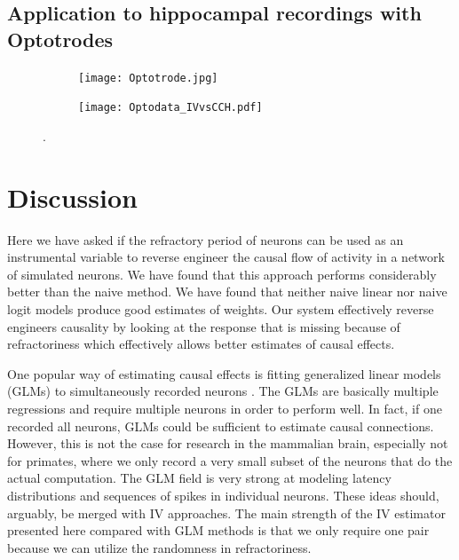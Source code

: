 \documentclass[11pt]{article}
\begin{document}
\subsection{Application to hippocampal recordings with Optotrodes}
\begin{figure}
\makeatletter
\renewcommand\p@subfigure{}
\makeatother
\begin{subfigure}{0.4\textwidth}
\texttt{[image: Optotrode.jpg]}
\caption{} \label{}
\end{subfigure}\hfill
\begin{subfigure}{0.6\textwidth}
\texttt{[image: Optodata\_IVvsCCH.pdf]}
\caption{} \label{}
\end{subfigure}

\caption{}.
\label{fig:optotrodedata}
 \end{figure}
\FloatBarrier
\section{Discussion}

Here we have asked if the refractory period of neurons can be used as an instrumental variable to reverse engineer the causal flow of activity in a network of simulated neurons. We have found that this approach performs considerably better than the naive method. We have found that neither naive linear nor naive logit models produce good estimates of weights. Our system effectively reverse engineers causality by looking at the response that is missing because of refractoriness which effectively allows better estimates of causal effects. 

One popular way of estimating causal effects is fitting generalized linear models (GLMs) to simultaneously recorded neurons \citep{pillow2008spatio}. The GLMs are basically multiple regressions and require multiple neurons in order to perform well. In fact, if one recorded all neurons, GLMs could be sufficient to estimate causal connections. However, this is not the case for research in the mammalian brain, especially not for primates, where we only record a very small subset of the neurons that do the actual computation. The GLM field is very strong at modeling latency distributions and sequences of spikes in individual neurons. These ideas should, arguably, be merged with IV approaches. The main strength of the  IV estimator presented here compared with GLM methods is that we only require one pair because we can utilize the randomness in refractoriness. 
\end{document}
